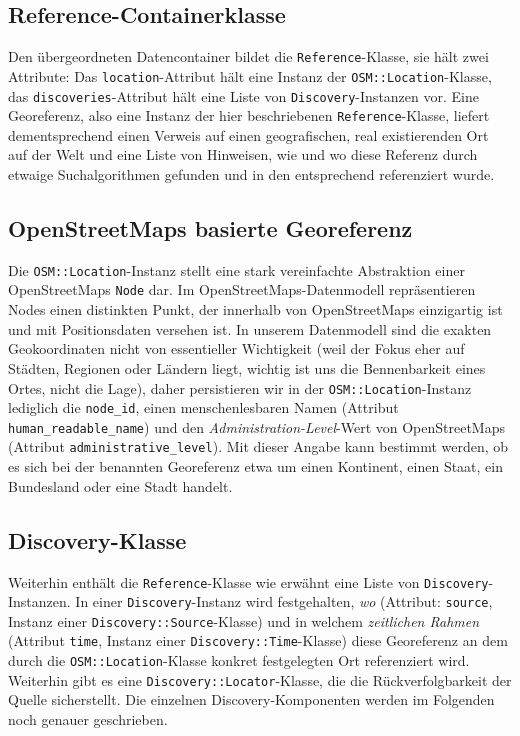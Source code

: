 \subsection{Reference-Containerklasse}
Den übergeordneten Datencontainer bildet die \texttt{Reference}-Klasse, sie hält zwei Attribute: Das \texttt{location}-Attribut hält eine Instanz der \texttt{OSM::Location}-Klasse, das \texttt{discoveries}-Attribut hält eine Liste von \texttt{Discovery}-Instanzen vor. Eine Georeferenz, also eine Instanz der hier beschriebenen  \texttt{Reference}-Klasse, liefert dementsprechend einen Verweis auf einen geografischen, real existierenden Ort auf der Welt und eine Liste von Hinweisen, wie und wo diese Referenz durch etwaige Suchalgorithmen gefunden und in den entsprechend referenziert wurde.

\subsection{OpenStreetMaps basierte Georeferenz}
Die \texttt{OSM::Location}-Instanz stellt eine stark vereinfachte Abstraktion einer OpenStreetMaps \texttt{Node}\cite{OSMnode} dar. Im OpenStreetMaps-Datenmodell repräsentieren Nodes einen distinkten Punkt, der innerhalb von OpenStreetMaps einzigartig ist und mit Positionsdaten versehen ist. In unserem Datenmodell sind die exakten Geokoordinaten nicht von essentieller Wichtigkeit (weil der Fokus eher auf Städten, Regionen oder Ländern liegt, wichtig ist uns die Bennenbarkeit eines Ortes, nicht die Lage), daher persistieren wir in der \texttt{OSM::Location}-Instanz lediglich die \texttt{node\_id}, einen menschenlesbaren Namen (Attribut \texttt{human\_readable\_name}) und den \textit{Administration-Level}-Wert von OpenStreetMaps\cite{OSMadminlevel} (Attribut \texttt{administrative\_level}). Mit dieser Angabe kann bestimmt werden, ob es sich bei der benannten Georeferenz etwa um einen Kontinent, einen Staat, ein Bundesland oder eine Stadt handelt.

\subsection{Discovery-Klasse}
Weiterhin enthält die \texttt{Reference}-Klasse wie erwähnt eine Liste von \texttt{Discovery}-Instanzen. In einer \texttt{Discovery}-Instanz wird festgehalten, \textit{wo} (Attribut: \texttt{source}, Instanz einer \texttt{Discovery::Source}-Klasse) und in welchem \textit{zeitlichen Rahmen} (Attribut \texttt{time}, Instanz einer \texttt{Discovery::Time}-Klasse) diese Georeferenz an dem durch die \texttt{OSM::Location}-Klasse konkret festgelegten Ort referenziert wird. Weiterhin gibt es eine \texttt{Discovery::Locator}-Klasse, die die Rückverfolgbarkeit der Quelle sicherstellt. Die einzelnen Discovery-Komponenten werden im Folgenden noch genauer geschrieben.

